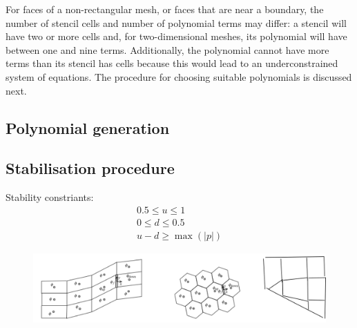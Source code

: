 For faces of a non-rectangular mesh, or faces that are near a boundary, the number of stencil cells and number of polynomial terms may differ: a stencil will have two or more cells and, for two-dimensional meshes, its polynomial will have between one and nine terms.  Additionally, the polynomial cannot have more terms than its stencil has cells because this would lead to an underconstrained system of equations.  The procedure for choosing suitable polynomials is discussed next.

\subsection{Polynomial generation}

\subsection{Stabilisation procedure}

Stability constriants:
\begin{align}
	0.5 \leq u \leq 1 \\
	0 \leq d \leq 0.5 \\
	u - d \geq \max(|p|)
\end{align}

\begin{figure}
	\includegraphics[width=\textwidth]{stencilConstruction.png}
	\caption{}
\end{figure}

